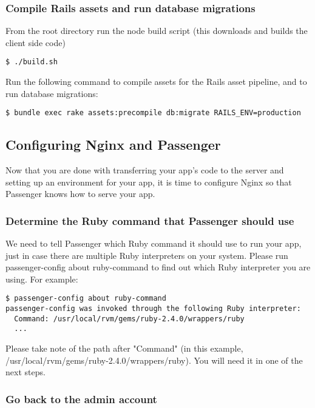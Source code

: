 \documentclass[11pt]{article}
\begin{document}
\subsubsection{Compile Rails assets and run database migrations}
\label{sec:org382fca0}

From the root directory run the node build script (this downloads and builds the client side code)

\begin{verbatim}
$ ./build.sh
\end{verbatim}

Run the following command to compile assets for the Rails asset pipeline, and to run database migrations:
\begin{verbatim}
$ bundle exec rake assets:precompile db:migrate RAILS_ENV=production
\end{verbatim}

\subsection{Configuring Nginx and Passenger}
\label{sec:org5b88f07}

Now that you are done with transferring your app's code to the server and setting up an environment for your app, it is time to configure Nginx so that Passenger knows how to serve your app.

\subsubsection{Determine the Ruby command that Passenger should use}
\label{sec:org3b0d70b}

We need to tell Passenger which Ruby command it should use to run your app, just in case there are multiple Ruby interpreters on your system. Please run passenger-config about ruby-command to find out which Ruby interpreter you are using. For example:

\begin{verbatim}
$ passenger-config about ruby-command
passenger-config was invoked through the following Ruby interpreter:
  Command: /usr/local/rvm/gems/ruby-2.4.0/wrappers/ruby
  ...
\end{verbatim}

Please take note of the path after "Command" (in this example, /usr/local/rvm/gems/ruby-2.4.0/wrappers/ruby). You will need it in one of the next steps.

\subsubsection{Go back to the admin account}
\label{sec:org4818378}
\end{document}
